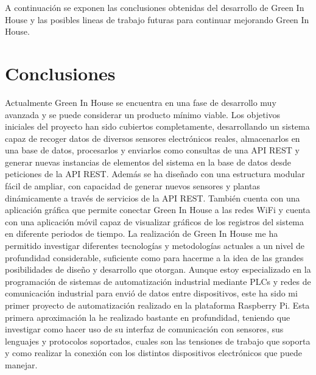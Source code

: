
A continuación se exponen las conclusiones obtenidas del desarrollo de Green In House y las posibles lineas de trabajo futuras para continuar mejorando Green In House.

\section{Conclusiones}
Actualmente Green In House se encuentra en una fase de desarrollo muy avanzada y se puede considerar un producto mínimo viable. Los objetivos iniciales del proyecto han sido cubiertos completamente, desarrollando un sistema capaz de recoger datos de diversos sensores electrónicos reales, almacenarlos en una base de datos, procesarlos y enviarlos como consultas de una API REST y generar nuevas instancias de elementos del sistema en la base de datos desde peticiones de la API REST. Además se ha diseñado con una estructura modular fácil de ampliar, con capacidad de generar nuevos sensores y plantas dinámicamente a través de servicios de la API REST. También cuenta con una aplicación gráfica que permite conectar Green In House a las redes WiFi y cuenta con una aplicación móvil capaz de visualizar gráficos de los registros del sistema en diferente periodos de tiempo.
La realización de Green In House me ha permitido investigar diferentes tecnologías y metodologías actuales a un nivel de profundidad considerable, suficiente como para hacerme a la idea de las grandes posibilidades de diseño y desarrollo que otorgan. 
Aunque estoy especializado en la programación de sistemas de automatización industrial mediante PLCs y redes de comunicación industrial para envió de datos entre dispositivos, este ha sido mi primer proyecto de automatización realizado  en la plataforma Raspberry Pi. Esta primera aproximación la he realizado bastante en profundidad, teniendo que investigar como hacer uso de su interfaz de comunicación con sensores, sus lenguajes y protocolos soportados, cuales son las tensiones de trabajo que soporta y como realizar la conexión con los distintos dispositivos electrónicos que puede manejar.
